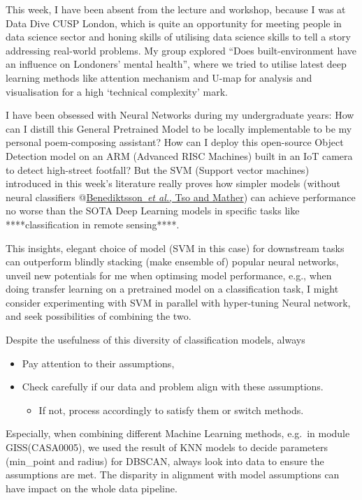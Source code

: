 \documentclass[
  letterpaper,
  DIV=11,
  numbers=noendperiod]{scrreprt}
\providecommand{\tightlist}{%
  \setlength{\itemsep}{0pt}\setlength{\parskip}{0pt}}\usepackage{longtable,booktabs,array}
\begin{document}
This week, I have been absent from the lecture and workshop, because I
was at Data Dive CUSP London, which is quite an opportunity for meeting
people in data science sector and honing skills of utilising data
science skills to tell a story addressing real-world problems. My group
explored ``Does built-environment have an influence on Londoners' mental
health'', where we tried to utilise latest deep learning methods like
attention mechanism and U-map for analysis and visualisation for a high
`technical complexity' mark.

I have been obsessed with Neural Networks during my undergraduate years:
How can I distill this General Pretrained Model to be locally
implementable to be my personal poem-composing assistant? How can I
deploy this open-source Object Detection model on an ARM (Advanced RISC
Machines) built in an IoT camera to detect high-street footfall? But the
SVM (Support vector machines) introduced in this week's literature
really proves how simpler models (without neural classifiers
@\href{https://ntrs.nasa.gov/citations/19900062611}{Benediktsson~\emph{et
al.}, Tso and Mather}) can achieve performance no worse than the SOTA
Deep Learning models in specific tasks like ****classification in remote
sensing****.

This insights, elegant choice of model (SVM in this case) for downstream
tasks can outperform blindly stacking (make ensemble of) popular neural
networks, unveil new potentials for me when optimsing model performance,
e.g., when doing transfer learning on a pretrained model on a
classification task, I might consider experimenting with SVM in parallel
with hyper-tuning Neural network, and seek possibilities of combining
the two.

Despite the usefulness of this diversity of classification models,
always

\begin{itemize}
\tightlist
\item
  Pay attention to their assumptions,
\item
  Check carefully if our data and problem align with these assumptions.

  \begin{itemize}
  \tightlist
  \item
    If not, process accordingly to satisfy them or switch methods.
  \end{itemize}
\end{itemize}

Especially, when combining different Machine Learning methods, e.g.~in
module GISS(CASA0005), we used the result of KNN models to decide
parameters (min\_point and radius) for DBSCAN, always look into data to
ensure the assumptions are met. The disparity in alignment with model
assumptions can have impact on the whole data pipeline.
\end{document}
